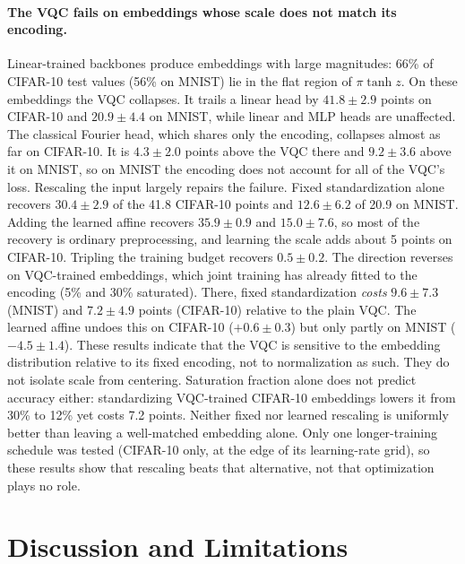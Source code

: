 \documentclass[10pt]{article}
\begin{document}
\paragraph{The VQC fails on embeddings whose scale does not match its encoding.}
Linear-trained backbones produce embeddings with large magnitudes: 66\% of
CIFAR-10 test values (56\% on MNIST) lie in the flat region of $\pi\tanh z$.
On these embeddings the VQC collapses. It trails a linear head by
$41.8 \pm 2.9$ points on CIFAR-10 and $20.9 \pm 4.4$ on MNIST, while linear
and MLP heads are unaffected. The classical Fourier head, which shares only the
encoding, collapses almost as far on CIFAR-10. It is $4.3 \pm 2.0$ points above
the VQC there and $9.2 \pm 3.6$ above it on MNIST, so on MNIST the encoding
does not account for all of the VQC's loss. Rescaling the input largely repairs
the failure. Fixed standardization alone recovers $30.4 \pm 2.9$ of the 41.8
CIFAR-10 points and $12.6 \pm 6.2$ of 20.9 on MNIST. Adding the learned affine
recovers $35.9 \pm 0.9$ and $15.0 \pm 7.6$, so most of the recovery is ordinary
preprocessing, and learning the scale adds about 5 points on CIFAR-10. Tripling
the training budget recovers $0.5 \pm 0.2$. The direction reverses on
VQC-trained embeddings, which joint training has already fitted to the
encoding (5\% and 30\% saturated). There, fixed standardization \emph{costs}
$9.6 \pm 7.3$ (MNIST) and $7.2 \pm 4.9$ points (CIFAR-10) relative to the
plain VQC. The learned affine undoes this on CIFAR-10 ($+0.6 \pm 0.3$) but only
partly on MNIST ($-4.5 \pm 1.4$). These
results indicate that the VQC is sensitive to the embedding distribution
relative to its fixed encoding, not to normalization as such. They do not
isolate scale from centering. Saturation fraction alone does not predict
accuracy either: standardizing VQC-trained CIFAR-10 embeddings lowers it from
30\% to 12\% yet costs 7.2 points. Neither fixed nor learned rescaling is
uniformly better than leaving a well-matched embedding alone. Only one
longer-training schedule was tested (CIFAR-10 only, at the edge of its
learning-rate grid), so these results show that rescaling beats that
alternative, not that optimization plays no role.

\section{Discussion and Limitations}
\end{document}
